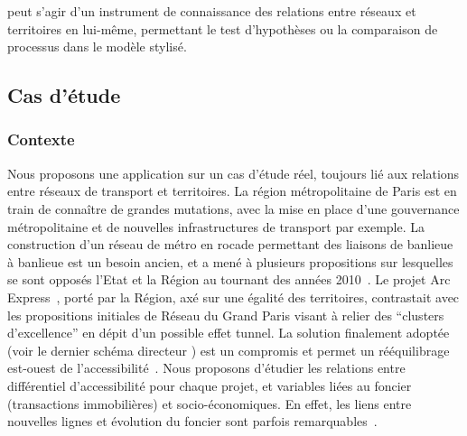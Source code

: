 \documentclass[french]{./sageo}
\begin{document}
peut s'agir d'un instrument de connaissance des relations entre réseaux et territoires en lui-même, permettant le test d'hypothèses ou la comparaison de processus dans le modèle stylisé.







\subsection{Cas d'étude}


\subsubsection{Contexte}

Nous proposons une application sur un cas d'étude réel, toujours lié aux relations entre réseaux de transport et territoires. La région métropolitaine de Paris est en train de connaître de grandes mutations, avec la mise en place d'une gouvernance métropolitaine et de nouvelles infrastructures de transport par exemple. La construction d'un réseau de métro en rocade permettant des liaisons de banlieue à banlieue est un besoin ancien, et a mené à plusieurs propositions sur lesquelles se sont opposés l'Etat et la Région au tournant des années 2010~\cite{desjardins2010bataille}. Le projet Arc Express~\cite{stif2007arc}, porté par la Région, axé sur une égalité des territoires, contrastait avec les propositions initiales de Réseau du Grand Paris visant à relier des ``clusters d'excellence'' en dépit d'un possible effet tunnel. La solution finalement adoptée (voir le dernier schéma directeur \cite{sdrif2013}) est un compromis et permet un rééquilibrage est-ouest de l'accessibilité~\cite{beaucire2013grand}. Nous proposons d'étudier les relations entre différentiel d'accessibilité pour chaque projet, et variables liées au foncier (transactions immobilières) et socio-économiques. En effet, les liens entre nouvelles lignes et évolution du foncier sont parfois remarquables~\cite{damm1980response}.
\end{document}

